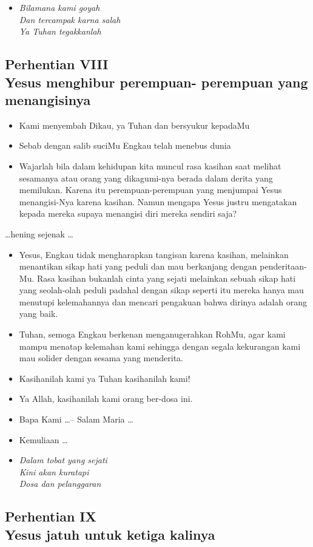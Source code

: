 \documentclass[a5paper,headsepline,titlepage,10pt,nnormalheadings,DIVcalc]{scrbook}
\newcommand{\BU}[1]{\begin{itemize} \item[U:] #1 \end{itemize}}
\newcommand{\BP}[1]{\begin{itemize} \item[P:] #1 \end{itemize}}
\begin{document}
\begin{itemize}
\item[8.] \it{Bilamana kami goyah\\
Dan tercampak karna salah\\
Ya Tuhan tegakkanlah}
\end{itemize}



\subsection*{Perhentian VIII
\\Yesus menghibur perempuan-
perempuan yang menangisinya}

\BP{Kami menyembah Dikau, ya Tuhan dan bersyukur kepadaMu}
\BU{Sebab dengan salib suciMu Engkau telah menebus dunia}
\BP{Wajarlah bila dalam kehidupan kita muncul rasa kasihan saat melihat sesamanya atau orang yang dikagumi-nya berada dalam derita yang memilukan. Karena itu perempuan-perempuan yang menjumpai Yesus menangisi-Nya karena kasihan. Namun mengapa Yesus justru mengatakan kepada mereka supaya menangisi diri mereka sendiri saja?}

\begin{center}\dots hening sejenak \dots\end{center}

\BP{Yesus, Engkau tidak mengharapkan tangisan karena kasihan, melainkan menantikan sikap hati yang peduli dan mau berkanjang dengan penderitaan-Mu. Rasa kasihan bukanlah cinta yang sejati melainkan sebuah sikap hati yang seolah-olah peduli padahal dengan sikap seperti itu mereka hanya mau menutupi kelemahannya dan mencari pengakuan bahwa dirinya adalah orang yang baik.}
\BU{Tuhan, semoga Engkau berkenan menganugerahkan RohMu, agar kami mampu menatap kelemahan kami sehingga dengan segala kekurangan kami mau solider dengan sesama yang menderita.}
\BP{Kasihanilah kami ya Tuhan kasihanilah kami!}
\BU{Ya Allah, kasihanilah kami orang ber-dosa ini.}
\BP{Bapa Kami \dots -- Salam Maria \dots}
\BP{Kemuliaan \dots}

\begin{itemize}
\item[9.] \it{Dalam tobat yang sejati\\
Kini akan kuratapi\\
Dosa dan pelanggaran}
\end{itemize}


\subsection*{Perhentian IX
\\Yesus jatuh untuk ketiga kalinya}
\end{document}
